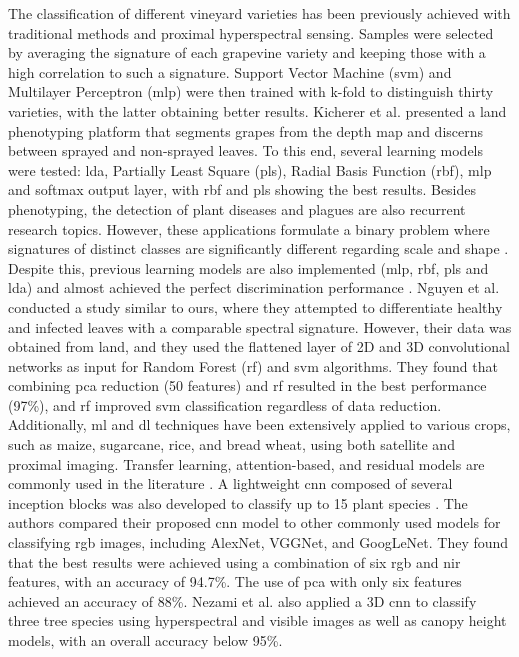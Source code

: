 The classification of different vineyard varieties has been previously achieved with traditional methods and proximal hyperspectral sensing. Samples were selected by averaging the signature of each grapevine variety and keeping those with a high correlation to such a signature. Support Vector Machine (\acrshort{svm}) and Multilayer Perceptron (\acrshort{mlp}) were then trained with k-fold to distinguish thirty varieties, with the latter obtaining better results. Kicherer et al. \cite{kicherer_phenoliner_2017} presented a land phenotyping platform that segments grapes from the depth map and discerns between sprayed and non-sprayed leaves. To this end, several learning models were tested: \acrshort{lda}, Partially Least Square (\acrshort{pls}), Radial Basis Function (\acrshort{rbf}), \acrshort{mlp} and softmax output layer, with \acrshort{rbf} and \acrshort{pls} showing the best results. Besides phenotyping, the detection of plant diseases \cite{nguyen_early_2021, bendel_detection_2020, bendel_evaluating_2020} and plagues \cite{mendes_vineinspector_2022, teixeira_systematic_2023} are also recurrent research topics. However, these applications formulate a binary problem where signatures of distinct classes are significantly different regarding scale \cite{bendel_detection_2020} and shape \cite{bendel_detection_2020}. Despite this, previous learning models are also implemented (\acrshort{mlp}, \acrshort{rbf}, \acrshort{pls} and \acrshort{lda}) and almost achieved the perfect discrimination performance \cite{bendel_evaluating_2020}. Nguyen et al. \cite{nguyen_early_2021} conducted a study similar to ours, where they attempted to differentiate healthy and infected leaves with a comparable spectral signature. However, their data was obtained from land, and they used the flattened layer of 2D and 3D convolutional networks as input for Random Forest (\acrshort{rf}) and \acrshort{svm} algorithms. They found that combining \acrshort{pca} reduction (50 features) and \acrshort{rf} resulted in the best performance (97\%), and \acrshort{rf} improved \acrshort{svm} classification regardless of data reduction. Additionally, \acrshort{ml} and \acrshort{dl} techniques have been extensively applied to various crops, such as maize, sugarcane, rice, and bread wheat, using both satellite and proximal imaging. Transfer learning, attention-based, and residual models are commonly used in the literature \cite{zhang_classification_2022}. A lightweight \acrshort{cnn} composed of several inception blocks was also developed to classify up to 15 plant species \cite{liu_plant_2022}. The authors compared their proposed \acrshort{cnn} model to other commonly used models for classifying \acrshort{rgb} images, including AlexNet, VGGNet, and GoogLeNet. They found that the best results were achieved using a combination of six \acrshort{rgb} and \acrshort{nir} features, with an accuracy of 94.7\%. The use of \acrshort{pca} with only six features achieved an accuracy of 88\%. Nezami et al. \cite{nezami_tree_2020} also applied a 3D \acrshort{cnn} to classify three tree species using hyperspectral and visible images as well as canopy height models, with an overall accuracy below 95\%.


